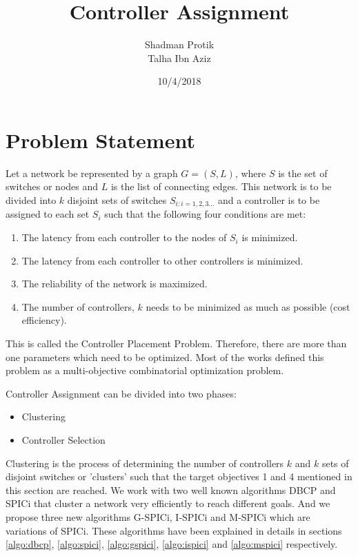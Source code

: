 \documentclass[10pt]{extarticle}
\begin{document}
	
	\twocolumn
	
	\title{Controller Assignment}
	\author{Shadman Protik\\Talha Ibn Aziz }
	\date{10/4/2018}
	\maketitle
	
	\section{Problem Statement} \label{prob}
	Let a network be represented by a graph $G=(S,L)$, where $S$ is the set of switches or nodes and $L$ is the list of connecting edges. This network is to be divided into $k$ disjoint sets of switches $S_{i:i=1,2,3...}$ and a controller is to be assigned to each set $S_i$ such that the following four conditions are met:
	\begin{enumerate}
		\item The latency from each controller to the nodes of $S_i$ is minimized.
		\item The latency from each controller to other controllers is minimized.
		\item The reliability of the network is maximized.
		\item The number of controllers, $k$ needs to be minimized as much as possible (cost efficiency). 
	\end{enumerate}
	
	This is called the Controller Placement Problem.
	Therefore, there are more than one parameters which need to be optimized. Most of the works\cite{dbcp} defined this problem as a multi-objective combinatorial optimization problem.
	
	Controller Assignment can be divided into two phases:
	\begin{itemize}
		\item Clustering
		\item Controller Selection
	\end{itemize}
	
	Clustering is the process of determining the number of controllers $k$ and $k$ sets of disjoint switches or 'clusters' such that the target objectives 1 and 4 mentioned in this section are reached. We work with two well known algorithms DBCP\cite{dbcp} and SPICi\cite{spici} that cluster a network very efficiently to reach different goals. And we propose three new algorithms G-SPICi, I-SPICi and M-SPICi which are variations of SPICi. These algorithms have been explained in details in sections \ref{algo:dbcp}, \ref{algo:spici}, \ref{algo:gspici}, \ref{algo:ispici} and \ref{algo:mspici} respectively.
	
\end{document}
